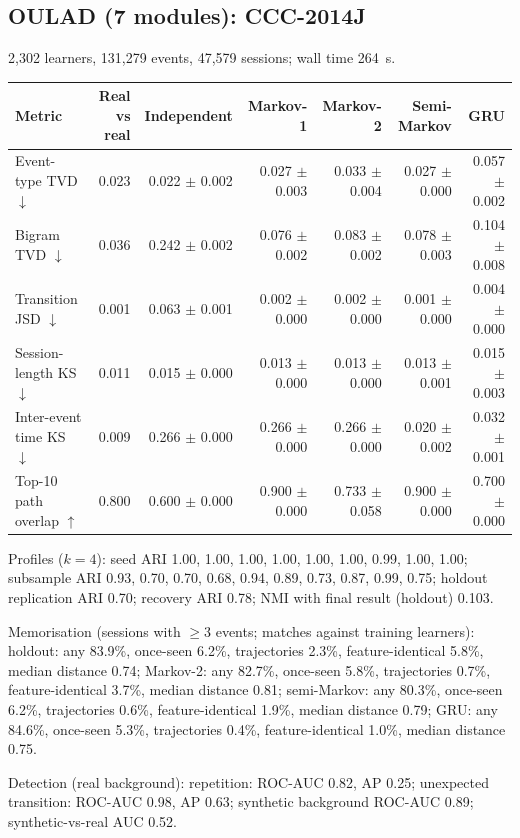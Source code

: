 \subsection*{OULAD (7 modules): CCC-2014J}
2{,}302 learners, 131{,}279 events, 47{,}579 sessions; wall time 264~s.

\begin{tabular}{l r r r r r r }
\toprule
Metric & Real vs real & Independent & Markov-1 & Markov-2 & Semi-Markov & GRU \\
\midrule
Event-type TVD $\downarrow$ & 0.023 & 0.022 $\pm$ 0.002 & 0.027 $\pm$ 0.003 & 0.033 $\pm$ 0.004 & 0.027 $\pm$ 0.000 & 0.057 $\pm$ 0.002 \\
Bigram TVD $\downarrow$ & 0.036 & 0.242 $\pm$ 0.002 & 0.076 $\pm$ 0.002 & 0.083 $\pm$ 0.002 & 0.078 $\pm$ 0.003 & 0.104 $\pm$ 0.008 \\
Transition JSD $\downarrow$ & 0.001 & 0.063 $\pm$ 0.001 & 0.002 $\pm$ 0.000 & 0.002 $\pm$ 0.000 & 0.001 $\pm$ 0.000 & 0.004 $\pm$ 0.000 \\
Session-length KS $\downarrow$ & 0.011 & 0.015 $\pm$ 0.000 & 0.013 $\pm$ 0.000 & 0.013 $\pm$ 0.000 & 0.013 $\pm$ 0.001 & 0.015 $\pm$ 0.003 \\
Inter-event time KS $\downarrow$ & 0.009 & 0.266 $\pm$ 0.000 & 0.266 $\pm$ 0.000 & 0.266 $\pm$ 0.000 & 0.020 $\pm$ 0.002 & 0.032 $\pm$ 0.001 \\
Top-10 path overlap $\uparrow$ & 0.800 & 0.600 $\pm$ 0.000 & 0.900 $\pm$ 0.000 & 0.733 $\pm$ 0.058 & 0.900 $\pm$ 0.000 & 0.700 $\pm$ 0.000 \\
\bottomrule
\end{tabular}

Profiles ($k=4$): seed ARI 1.00, 1.00, 1.00, 1.00, 1.00, 1.00, 0.99, 1.00, 1.00; subsample ARI 0.93, 0.70, 0.70, 0.68, 0.94, 0.89, 0.73, 0.87, 0.99, 0.75; holdout replication ARI 0.70; recovery ARI 0.78; NMI with final result (holdout) 0.103.

Memorisation (sessions with $\geq$3 events; matches against training learners): holdout: any 83.9\%, once-seen 6.2\%, trajectories 2.3\%, feature-identical 5.8\%, median distance 0.74; Markov-2: any 82.7\%, once-seen 5.8\%, trajectories 0.7\%, feature-identical 3.7\%, median distance 0.81; semi-Markov: any 80.3\%, once-seen 6.2\%, trajectories 0.6\%, feature-identical 1.9\%, median distance 0.79; GRU: any 84.6\%, once-seen 5.3\%, trajectories 0.4\%, feature-identical 1.0\%, median distance 0.75.

Detection (real background): repetition: ROC-AUC 0.82, AP 0.25; unexpected transition: ROC-AUC 0.98, AP 0.63; synthetic background ROC-AUC 0.89; synthetic-vs-real AUC 0.52.

